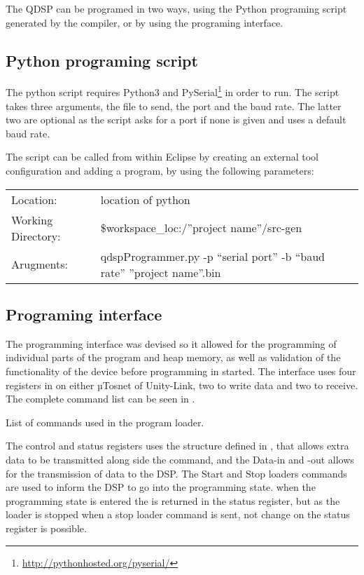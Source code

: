 The QDSP can be programed in two ways, using the Python programing script generated by the compiler, or by using the programing interface.

\subsection{Python programing script}
The python script requires Python3 and PySerial\footnote{\url{http://pythonhosted.org/pyserial/}} in order to run. The script takes three arguments, the file to send, the port and the baud rate. The latter two are optional as the script asks for a port if none is given and uses a default baud rate.

The script can be called from within Eclipse by creating an external tool configuration and adding a program, by using the following parameters:

\begin{tabular}{ll}
	Location: & location of python \\
	Working Directory: & \${workspace\_loc:/''project name''/src-gen} \\
	Arugments: & qdspProgrammer.py -p ``serial port'' -b ``baud rate'' ''project name''.bin
\end{tabular}

 


\subsection{Programing interface}
The programming interface was devised so it allowed for the programming of individual parts of the program and heap memory, as well as validation of the functionality of the device before programming in started. The interface uses four registers in on either µTosnet of Unity-Link, two to write data and two to receive. The complete command list can be seen in .

\begin{table}[H]
	\centering
		
		\caption{List of commands used in the program loader.}
		\label{tab:registers}
\end{table}


The control and status registers uses the structure defined in , that allows extra data to be transmitted along side the command, and the Data-in and -out allows for the transmission of data to the DSP. The Start and Stop loaders commands are used to inform the DSP to go into the programming state. when the programming state is entered the is returned in the status register, but as the loader is stopped when a stop loader command is sent, not change on the status register is possible.

